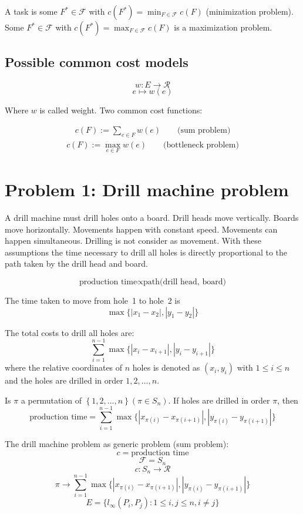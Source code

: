 \documentclass{article}
\newcommand{\set}[1]{\left\{#1\right\}}
\begin{document}
A task is some $F^* \in \mathcal{F}$ with $c(F^*) = \min_{F \in \mathcal{F}} c(F)$
(minimization problem). Some $F^* \in \mathcal{F}$ with $c(F^*) = \max_{F \in \mathcal{F}} c(F)$
is a maximization problem.

\subsection{Possible common cost models}
%
\[
    w: E \rightarrow \mathcal{R}
\] \[
    e \mapsto w(e)
\]

Where $w$ is called weight. Two common cost functions:

\begin{align}
    c(F) := \sum_{e \in F} w(e)  \qquad \text{(sum problem)}
\end{align}
\begin{align}
    c(F) := \max_{e \in F} w(e)  \qquad \text{(bottleneck problem)}
\end{align}

\section{Problem 1: Drill machine problem}
%
A drill machine must drill holes onto a board. Drill heads move vertically. Boards move horizontally. Movements happen with constant speed. Movements can happen simultaneous. Drilling is not consider as movement. With these assumptions the time necessary to drill all holes is directly proportional to the path taken by the drill head and board.

\[
    \text{production time} \propto \text{path(drill head, board)}
\]

The time taken to move from hole~1 to hole~2 is
\[
    \max\{|x_1 - x_2|, |y_1 - y_2|\}
\]

The total costs to drill all holes are:
\[
    \sum_{i=1}^{n-1} \max\{|x_i - x_{i+1}|, |y_i - y_{i+1}|\}
\]
where the relative coordinates of $n$ holes is denoted as $(x_i, y_i)$ with $1 \leq i \leq n$ and the holes are drilled in order $1, 2, \ldots, n$.

Is $\pi$ a permutation of $\set{1, 2, \ldots, n} (\pi \in S_n)$. If holes are drilled in order $\pi$, then
\[
    \text{production time} = \sum_{i=1}^{n-1} \max\{|x_{\pi(i)} - x_{\pi(i+1)}|, |y_{\pi(i)} - y_{\pi(i+1)}|\}
\]

The drill machine problem as generic problem (sum problem):
\[
    c = \text{production time}
\] \[
    \mathcal{F} = S_n
\] \[
    c: S_n \rightarrow \mathcal{R}
\] \[
    \pi \rightarrow \sum_{i=1}^{n-1} \max\{|x_{\pi(i)} - x_{\pi(i+1)}|, |y_{\pi(i)} - y_{\pi(i+1)}|\}
\] \[
    E = \{l_\infty(P_i, P_j): 1 \leq i, j \leq n, i \neq j\}
\]
\end{document}
